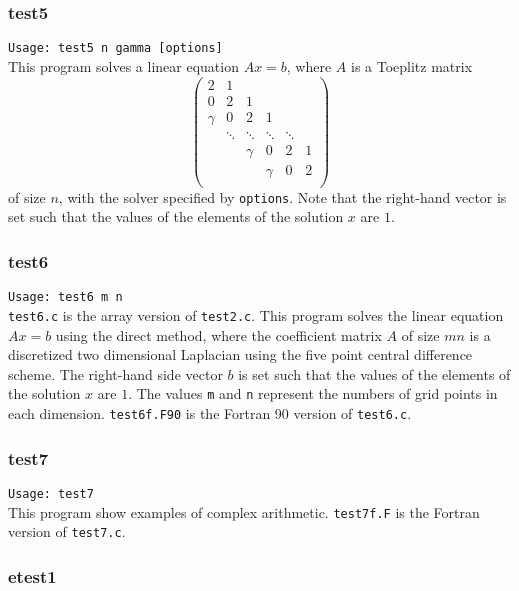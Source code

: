 \documentclass[a4paper]{article}
\begin{document}
\subsubsection{test5}

\verb+Usage: test5 n gamma [options]+\\

This program solves a linear equation $Ax =b$, where $A$ is a Toeplitz matrix
\[
\left(
\begin{array}{cccccc}
2 & 1 &   &  &  & \\
0 & 2 & 1 &  &  & \\
\gamma & 0& 2 & 1 &  & \\
 & \ddots & \ddots & \ddots & \ddots & \\
 &  &   \gamma &0 &       2   & 1 \\
 &  &  &   \gamma & 0& 2 \\
\end{array}
\right)
\]
of size $n$, with the solver specified by {\tt options}. 
Note that the right-hand vector is set such that the values of the elements 
of the solution $x$ are $1$. 

\subsubsection{test6}

\verb+Usage: test6 m n+\\

{\tt test6.c} is the array version of {\tt test2.c}.
This program solves the linear equation $Ax = b$ using the direct method,
where the coefficient 
matrix $A$ of size $mn$ is a discretized two dimensional 
Laplacian using the five
point central difference scheme. 
The right-hand side vector $b$ is set such that the values of the elements
of the solution $x$ are $1$. 
The values {\tt m} and  {\tt n} represent the numbers of grid points
in each dimension. 
{\tt test6f.F90} is the Fortran 90 version of {\tt test6.c}.

\subsubsection{test7}

\verb+Usage: test7+\\

This program show examples of complex arithmetic.
{\tt test7f.F} is the Fortran version of {\tt test7.c}.

\subsubsection{etest1}
\end{document}
